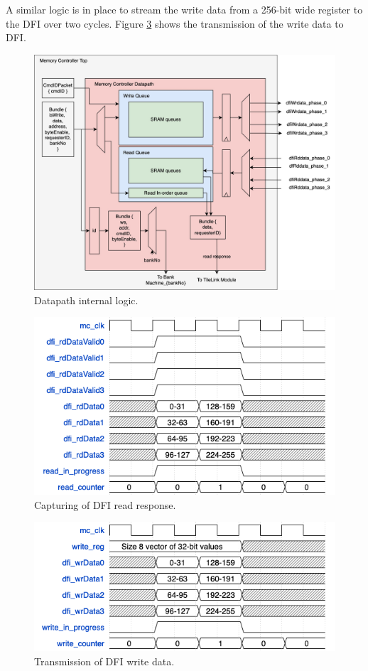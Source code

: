 A similar logic is in place to stream the write data from a 256-bit wide register to the DFI over two cycles.  Figure \ref{fig:write-trans} shows the transmission of the write data to DFI. 
\begin{figure}
    \centering
    \includegraphics[scale=0.2]{images/datapath-u.jpg}
    \caption{Datapath internal logic.}
    \label{fig:data_uarch}
\end{figure}
\begin{figure}
    \centering
    \includegraphics[scale=0.5]{images/read-capture.png}
    \caption{Capturing of DFI read response.}
    \label{fig:read-cap}
\end{figure}
\begin{figure}
    \centering
    \includegraphics[scale=0.5]{images/writes-to-dfi-mod.png}
    \caption{Transmission of DFI write data.}
    \label{fig:write-trans}
\end{figure}
\newpage

